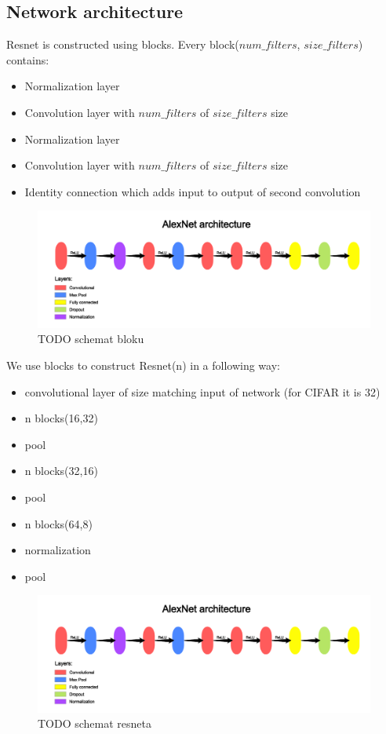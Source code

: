 \documentclass[licencjacka]{pracamgr}
\begin{document}
		\subsection{Network architecture}
		Resnet is constructed using blocks. Every block($num\_filters$, $size\_filters$) contains:
		\begin{itemize}
			\item Normalization layer
			\item Convolution layer with $num\_filters$ of $size\_filters$ size
			\item Normalization layer
			\item Convolution layer with $num\_filters$ of $size\_filters$ size
			\item Identity connection which adds input to output of second convolution
		\end{itemize}
		\begin{figure}[h]
		\caption{TODO schemat bloku}
				\centering
				\includegraphics[width=\textwidth]{AlexNet}
		\end{figure}
		We use blocks to construct Resnet(n) in a following way:
		\begin{itemize}
			\item convolutional layer of size matching input of network (for CIFAR it is 32)
			\item n blocks(16,32)
			\item pool
			\item n blocks(32,16)
			\item pool
			\item n blocks(64,8)
			\item normalization 
			\item pool
		\end{itemize}
		\begin{figure}[h]
		\caption{TODO schemat resneta}
				\centering
				\includegraphics[width=\textwidth]{AlexNet}
		\end{figure}
\end{document}
